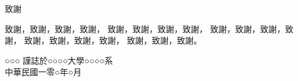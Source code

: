     \begin{center}
        \huge{致謝}
    \end{center}

    \fontsize{12}{18pt}\selectfont
    \hspace{7mm}
        致謝，致謝，致謝，致謝，
        致謝，致謝，致謝，致謝，
        致謝，致謝，致謝，致謝，
        致謝，致謝，致謝，致謝，
        致謝，致謝，致謝。
    \vspace*{15mm}

    \begin{flushright}
       ○○○ 謹誌於○○○○大學○○○○系 \\   中華民國一零○年○月
    \end{flushright}
